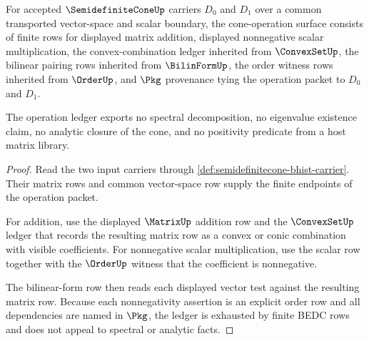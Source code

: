 \begin{theorem}
\label{thm:semidefinitecone-cone-operation-ledger}
For accepted $\SemidefiniteConeUp$ carriers $D_0$ and $D_1$ over a common transported vector-space and scalar boundary, the cone-operation surface consists of finite rows for displayed matrix addition, displayed nonnegative scalar multiplication, the convex-combination ledger inherited from $\ConvexSetUp$, the bilinear pairing rows inherited from $\BilinFormUp$, the order witness rows inherited from $\OrderUp$, and $\Pkg$ provenance tying the operation packet to $D_0$ and $D_1$.

The operation ledger exports no spectral decomposition, no eigenvalue existence claim, no analytic closure of the cone, and no positivity predicate from a host matrix library.
\end{theorem}
\begin{proof}
Read the two input carriers through \autoref{def:semidefinitecone-bhist-carrier}. Their matrix rows and common vector-space row supply the finite endpoints of the operation packet.

For addition, use the displayed $\MatrixUp$ addition row and the $\ConvexSetUp$ ledger that records the resulting matrix row as a convex or conic combination with visible coefficients. For nonnegative scalar multiplication, use the scalar row together with the $\OrderUp$ witness that the coefficient is nonnegative.

The bilinear-form row then reads each displayed vector test against the resulting matrix row. Because each nonnegativity assertion is an explicit order row and all dependencies are named in $\Pkg$, the ledger is exhausted by finite BEDC rows and does not appeal to spectral or analytic facts.
\end{proof}

